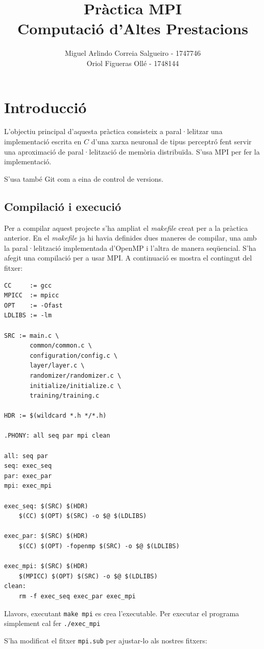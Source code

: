 \documentclass{article}
\title{Pràctica MPI \\ Computació d'Altes Prestacions}
\author{Miguel Arlindo Correia Salgueiro - 1747746 \\Oriol Figueras Ollé - 1748144}
\date{}
\begin{document}
\maketitle

\newpage
\tableofcontents
\newpage

\section{Introducció}
L'objectiu principal d'aquesta pràctica consisteix a paral·lelitzar una implementació escrita en $C$ d'una xarxa neuronal de tipus perceptró fent servir una aproximació de paral·lelització de memòria distribuïda. S'usa MPI per fer la implementació.

S'usa també Git com a eina de control de versions.

\subsection{Compilació i execució}
Per a compilar aquest projecte s'ha ampliat el \textit{makefile} creat per a la pràctica anterior.
En el \textit{makefile} ja hi havia definides dues maneres de compilar, una amb la paral·lelització implementada d'OpenMP i l'altra de manera seqüencial. S'ha afegit una compilació per a usar MPI.
A continuació es mostra el contingut del fitxer:
\begin{verbatim}
CC     := gcc
MPICC  := mpicc
OPT    := -Ofast
LDLIBS := -lm

SRC := main.c \
       common/common.c \
       configuration/config.c \
       layer/layer.c \
       randomizer/randomizer.c \
       initialize/initialize.c \
       training/training.c

HDR := $(wildcard *.h */*.h)

.PHONY: all seq par mpi clean

all: seq par
seq: exec_seq
par: exec_par
mpi: exec_mpi

exec_seq: $(SRC) $(HDR)
	$(CC) $(OPT) $(SRC) -o $@ $(LDLIBS)

exec_par: $(SRC) $(HDR)
	$(CC) $(OPT) -fopenmp $(SRC) -o $@ $(LDLIBS)

exec_mpi: $(SRC) $(HDR)
	$(MPICC) $(OPT) $(SRC) -o $@ $(LDLIBS)
clean:
	rm -f exec_seq exec_par exec_mpi
\end{verbatim}

Llavors, executant \texttt{make mpi} es crea l'executable. Per executar el programa simplement cal fer \texttt{./exec\_mpi}

S'ha modificat el fitxer \texttt{mpi.sub} per ajustar-lo als nostres fitxers:
\end{document}
